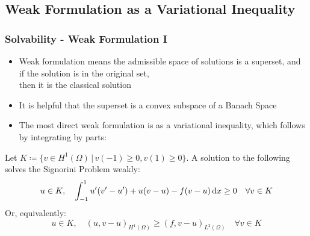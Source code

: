 \subsection{Weak Formulation as a Variational Inequality}
\begin{frame}
\frametitle{Solvability - Weak Formulation I}
\begin{itemize}
	\item Weak formulation means the admissible space of solutions is a superset, and if the solution is in the original set,\\ then it is the classical solution
	\item It is helpful that the superset is a convex subspace of a Banach Space
	\item The most direct weak formulation is as a variational inequality, which follows by integrating by parts:
\end{itemize}
\begin{theorem} 
	Let $K \coloneqq \{ v\in H^1(\Omega) \,|\, v(-1) \geq 0, v(1) \geq 0 \}$. A solution to the following solves the Signorini Problem weakly:
	\begin{equation}
		u \in K,\quad \int_{-1}^1 u'(v'-u') + u(v-u) - f(v-u) \dif x \geq 0 \quad \forall v \in K \label{eq:variational_inequality}
	\end{equation}
	Or, equivalently:
	\begin{equation}
		u \in K,\quad (u,v-u)_{H^1(\Omega)} \geq (f,v-u)_{L^2(\Omega)} \quad \forall v \in K
	\end{equation}
\end{theorem}
\end{frame}

